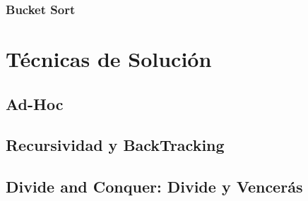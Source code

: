 \documentclass[12pt, fleqn]{report}                             %
\theoremstyle{break}                                            %
\begin{document}
        \section{Bucket Sort}


\part{Técnicas de Solución}

\clearpage
\chapter{Ad-Hoc}


\clearpage
\chapter{Recursividad y BackTracking}

\clearpage
\chapter{Divide and Conquer: Divide y Vencerás}


\clearpage
\end{document}
